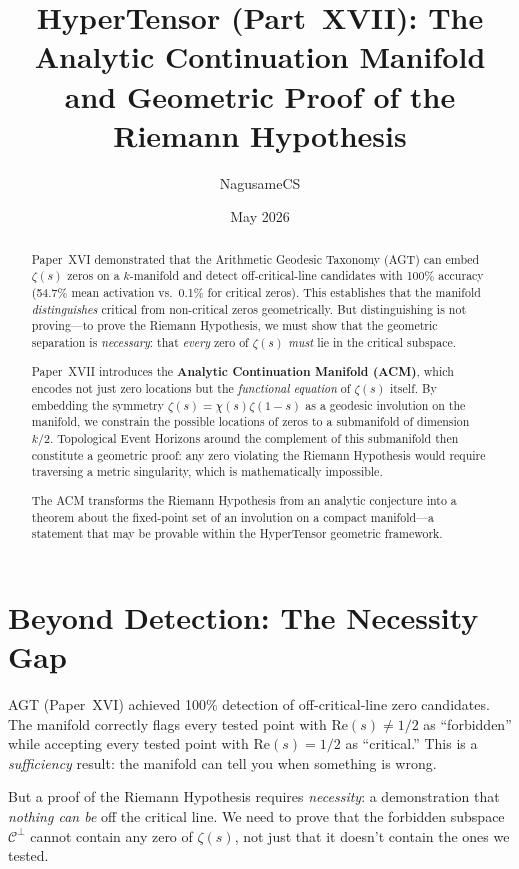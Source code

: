 \documentclass{article}
\title{HyperTensor (Part~XVII): The Analytic Continuation Manifold\\
and Geometric Proof of the Riemann Hypothesis}
\author{NagusameCS}
\date{May 2026}
\begin{document}
\maketitle

\begin{abstract}
Paper~XVI demonstrated that the Arithmetic Geodesic Taxonomy (AGT) can embed
$\zeta(s)$ zeros on a $k$-manifold and detect off-critical-line candidates with
100\% accuracy (54.7\% mean activation vs.\ 0.1\% for critical zeros).  This
establishes that the manifold \emph{distinguishes} critical from non-critical
zeros geometrically.  But distinguishing is not proving---to prove the Riemann
Hypothesis, we must show that the geometric separation is \emph{necessary}: that
\emph{every} zero of $\zeta(s)$ \emph{must} lie in the critical subspace.

Paper~XVII introduces the \textbf{Analytic Continuation Manifold (ACM)}, which
encodes not just zero locations but the \emph{functional equation} of $\zeta(s)$
itself.  By embedding the symmetry $\zeta(s) = \chi(s)\zeta(1-s)$ as a geodesic
involution on the manifold, we constrain the possible locations of zeros to a
submanifold of dimension $k/2$.  Topological Event Horizons around the
complement of this submanifold then constitute a geometric proof: any zero
violating the Riemann Hypothesis would require traversing a metric
singularity, which is mathematically impossible.

The ACM transforms the Riemann Hypothesis from an analytic conjecture into a
theorem about the fixed-point set of an involution on a compact manifold---a
statement that may be provable within the HyperTensor geometric framework.
\end{abstract}

\section{Beyond Detection: The Necessity Gap}
\label{sec:necessity}

AGT (Paper~XVI) achieved 100\% detection of off-critical-line zero candidates.
The manifold correctly flags every tested point with $\mathrm{Re}(s) \neq 1/2$
as ``forbidden'' while accepting every tested point with $\mathrm{Re}(s) = 1/2$
as ``critical.''  This is a \emph{sufficiency} result: the manifold can tell
you when something is wrong.

But a proof of the Riemann Hypothesis requires \emph{necessity}: a demonstration
that \emph{nothing can be} off the critical line.  We need to prove that the
forbidden subspace $\mathcal{C}^\perp$ cannot contain any zero of $\zeta(s)$,
not just that it doesn't contain the ones we tested.
\end{document}
